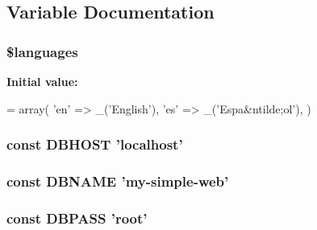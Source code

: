 \subsection{Variable Documentation}
\hypertarget{dbconfig__sample_8php_a8856d0a49881ef8e0a6d205d37d4a7af}{
\subsubsection[{\$languages}]{\setlength{\rightskip}{0pt plus 5cm}\$languages}}\label{dbconfig__sample_8php_a8856d0a49881ef8e0a6d205d37d4a7af}
{\bfseries Initial value\-:}
\begin{DoxyCode}
= array(
        \textcolor{stringliteral}{'en'}    => \_(\textcolor{stringliteral}{'English'}),
        \textcolor{stringliteral}{'es'}    => \_(\textcolor{stringliteral}{'Espa&ntilde;ol'}),
    )
\end{DoxyCode}
\hypertarget{dbconfig__sample_8php_a40edb9274f7711736cc3ee12d2e5ddba}{
\subsubsection[{D\-B\-H\-O\-S\-T}]{\setlength{\rightskip}{0pt plus 5cm}const D\-B\-H\-O\-S\-T 'localhost'}}\label{dbconfig__sample_8php_a40edb9274f7711736cc3ee12d2e5ddba}
\hypertarget{dbconfig__sample_8php_af7d219badcc93cc3a13a604c769542bc}{
\subsubsection[{D\-B\-N\-A\-M\-E}]{\setlength{\rightskip}{0pt plus 5cm}const D\-B\-N\-A\-M\-E 'my-\/simple-\/web'}}\label{dbconfig__sample_8php_af7d219badcc93cc3a13a604c769542bc}
\hypertarget{dbconfig__sample_8php_add7bef9fbed1ad1fa386dcb65fd5d813}{
\subsubsection[{D\-B\-P\-A\-S\-S}]{\setlength{\rightskip}{0pt plus 5cm}const D\-B\-P\-A\-S\-S 'root'}}\label{dbconfig__sample_8php_add7bef9fbed1ad1fa386dcb65fd5d813}
